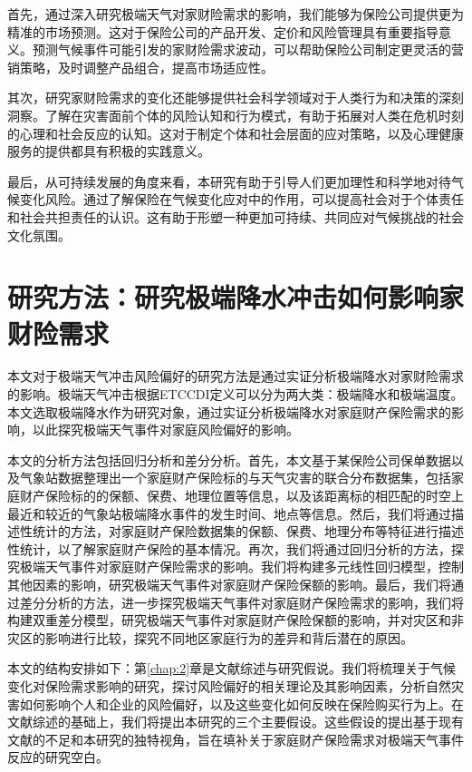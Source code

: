 首先，通过深入研究极端天气对家财险需求的影响，我们能够为保险公司提供更为精准的市场预测。这对于保险公司的产品开发、定价和风险管理具有重要指导意义。预测气候事件可能引发的家财险需求波动，可以帮助保险公司制定更灵活的营销策略，及时调整产品组合，提高市场适应性。

其次，研究家财险需求的变化还能够提供社会科学领域对于人类行为和决策的深刻洞察。了解在灾害面前个体的风险认知和行为模式，有助于拓展对人类在危机时刻的心理和社会反应的认知。这对于制定个体和社会层面的应对策略，以及心理健康服务的提供都具有积极的实践意义。

最后，从可持续发展的角度来看，本研究有助于引导人们更加理性和科学地对待气候变化风险。通过了解保险在气候变化应对中的作用，可以提高社会对于个体责任和社会共担责任的认识。这有助于形塑一种更加可持续、共同应对气候挑战的社会文化氛围。

\section{研究方法：研究极端降水冲击如何影响家财险需求}
本文对于极端天气冲击风险偏好的研究方法是通过实证分析极端降水对家财险需求的影响。极端天气冲击根据ETCCDI\citep{alexander2006global}定义可以分为两大类：极端降水和极端温度。本文选取极端降水作为研究对象，通过实证分析极端降水对家庭财产保险需求的影响，以此探究极端天气事件对家庭风险偏好的影响。

本文的分析方法包括回归分析和差分分析。首先，本文基于某保险公司保单数据以及气象站数据整理出一个家庭财产保险标的与天气灾害的联合分布数据集，包括家庭财产保险标的的保额、保费、地理位置等信息，以及该距离标的相匹配的时空上最近和较近的气象站极端降水事件的发生时间、地点等信息。然后，我们将通过描述性统计的方法，对家庭财产保险数据集的保额、保费、地理分布等特征进行描述性统计，以了解家庭财产保险的基本情况。再次，我们将通过回归分析的方法，探究极端天气事件对家庭财产保险需求的影响。我们将构建多元线性回归模型，控制其他因素的影响，研究极端天气事件对家庭财产保险保额的影响。最后，我们将通过差分分析的方法，进一步探究极端天气事件对家庭财产保险需求的影响，我们将构建双重差分模型，研究极端天气事件对家庭财产保险保额的影响，并对灾区和非灾区的影响进行比较，探究不同地区家庭行为的差异和背后潜在的原因。

本文的结构安排如下：第\ref{chap:2}章是文献综述与研究假说。我们将梳理关于气候变化对保险需求影响的研究，探讨风险偏好的相关理论及其影响因素，分析自然灾害如何影响个人和企业的风险偏好，以及这些变化如何反映在保险购买行为上。在文献综述的基础上，我们将提出本研究的三个主要假设。这些假设的提出基于现有文献的不足和本研究的独特视角，旨在填补关于家庭财产保险需求对极端天气事件反应的研究空白。

